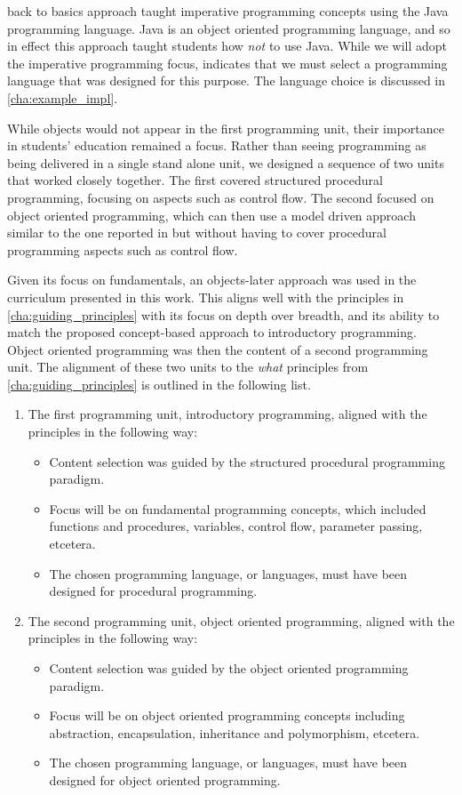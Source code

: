 \citet{Reges:2006} back to basics approach taught imperative programming concepts using the Java programming language. Java is an object oriented programming language, and so in effect this approach taught students how \emph{not} to use Java. While we will adopt the imperative programming focus,  indicates that we must select a programming language that was designed for this purpose. The language choice is discussed in \cref{cha:example_impl}.

While objects would not appear in the first programming unit, their importance in students' education remained a focus. Rather than seeing programming as being delivered in a single stand alone unit, we designed a sequence of two units that worked closely together. The first covered structured procedural programming, focusing on aspects such as control flow. The second focused on object oriented programming, which can then use a model driven approach similar to the one reported in \citet{Bennedsen:2004} but without having to cover procedural programming aspects such as control flow.

Given its focus on fundamentals, an objects-later approach was used in the curriculum presented in this work. This aligns well with the principles in \cref{cha:guiding_principles} with its focus on depth over breadth, and its ability to match the proposed concept-based approach to introductory programming. Object oriented programming was then the content of a second programming unit. The alignment of these two units to the \emph{what} principles from \cref{cha:guiding_principles} is outlined in the following list.
\begin{enumerate}
	\item The first programming unit, introductory programming, aligned with the principles in the following way:
	\begin{itemize}[noitemsep,nolistsep]
		\item Content selection was guided by the structured procedural programming paradigm.
		\item Focus will be on fundamental programming concepts, which included functions and procedures, variables, control flow, parameter passing, etcetera.
		\item The chosen programming language, or languages, must have been designed for procedural programming.
	\end{itemize}
	\item The second programming unit, object oriented programming, aligned with the principles in the following way:
	\begin{itemize}[noitemsep,nolistsep]
		\item Content selection was guided by the object oriented programming paradigm.
		\item Focus will be on object oriented programming concepts including abstraction, encapsulation, inheritance and polymorphism, etcetera.
		\item The chosen programming language, or languages, must have been designed for object oriented programming.
	\end{itemize}
\end{enumerate}



